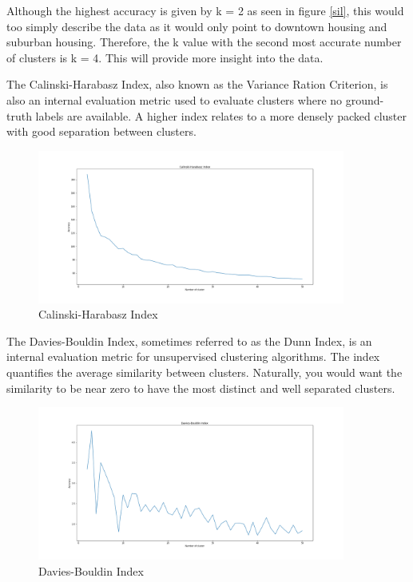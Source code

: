 \documentclass{article}
\begin{document}
Although the highest accuracy is given by k = 2 as seen in figure \ref{sil}, this would too simply describe the data as it would only point to downtown housing and suburban housing. Therefore, the k value with the second most accurate number of clusters is k = 4. This will provide more insight into the data.

The Calinski-Harabasz Index, also known as the Variance Ration Criterion, is also an internal evaluation metric used to evaluate clusters where no ground-truth labels are available. A higher index relates to a more densely packed cluster with good separation between clusters. 

\begin{figure}[h!]
	\centering
	\includegraphics[width=0.9\textwidth]{ch.png}
	\caption{Calinski-Harabasz Index}
	\label{ch}
\end{figure}

The Davies-Bouldin Index, sometimes referred to as the Dunn Index, is an internal evaluation metric for unsupervised clustering algorithms. The index quantifies the average similarity between clusters. Naturally, you would want the similarity to be near zero to have the most distinct and well separated clusters.


\begin{figure}[h!]
	\centering
	\includegraphics[width=0.9\textwidth]{dunn.png}
	\caption{Davies-Bouldin Index}
	\label{dunn}
\end{figure}
\end{document}
